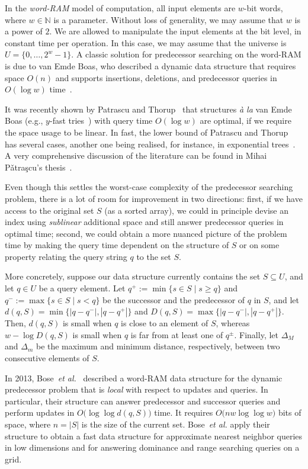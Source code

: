 \documentclass[a4paper,11pt]{article}
\newcommand{\N}{\mathbb{N}}
\newcommand{\etal}{\emph{et al.}\xspace}
\newcommand{\?}{\mskip1.5mu}
\begin{document}
In the \emph{word-RAM } model of computation,
all input elements are $w$-bit words, where
$w \in \N$ is a parameter. Without loss of 
generality, we may assume that $w$ is a power 
of $2$. We are allowed to manipulate the input 
elements at the bit level, in constant time per 
operation. In this case, we may assume that the 
universe is $U = \{0, \dots, 2^{w}-1\}$. 
A classic solution for predecessor searching on the
word-RAM is due to van Emde Boas, who
described a dynamic data structure that
requires space $O(n)$ and supports insertions,
deletions, and predecessor queries in $O(\log w)$ 
time~\cite{vEmdeBoas77,vEmdeBoasKaZi76}.


It was recently shown by Patrascu and 
Thorup~\cite{PatrascuTh06,PatrascuTh07} 
that structures \emph{\` a la} van Emde Boas 
(e.g., $y$-fast tries~\cite{Willard83}) with query
time $O(\log w)$ are optimal, if we require 
the space usage to be linear. In fast, the lower bound 
of Patrascu and Thorup~\cite{PatrascuTh06,PatrascuTh07} 
has several cases, another one being realised, for 
instance, in exponential trees~\cite{AnderssonTh07}. 
A very comprehensive discussion of the literature 
can be found in Mihai P{\v a}tra{\c s}cu's
thesis~\cite{Patrascu08}.

Even though this settles the worst-case complexity 
of the predecessor searching problem, there is a lot 
of room for improvement in two directions: first, if 
we have access to the original set $S$ (as a sorted array), 
we could in principle devise an index using 
\emph{sublinear} additional space and still answer 
predecessor queries in optimal time; second, we could
obtain a more nuanced picture of the problem time by 
making the query time dependent on the structure of $S$ 
or on some property relating the query string $q$ to 
the set $S$.

More concretely, suppose our data structure currently contains the
set $S \subseteq U$, and let $q \in U$ be a query
element.  Let $q^+ := \min\{s \in S \mid s \geq q \}$ and
$q^- := \max\{s \in S \mid s < q \}$ be the 
successor and the predecessor of $q$ in $S$, and let
$d(q, S) = \min\{|q - q^-|, |q - q^+|\}$ and 
$D(q, S) = \max\{|q - q^-|, |q - q^+|\}$.
Then, $d(q, S)$ is small when $q$ is close to an 
element of $S$, whereas $w - \log D(q, S)$
is small when $q$ is far from at least one of $q^\pm$.
Finally, let $\Delta_M$ and $\Delta_m$ be the maximum 
and minimum distance, respectively,
between two consecutive elements of $S$.

In 2013, Bose~\etal~\cite{BoseDoDuHoMo13} described
a word-RAM data structure for the dynamic predecessor
problem that is \emph{local} with respect to updates
and queries.
In particular, their structure can answer predecessor 
and successor queries and perform updates 
in $O\big(\log\log d(q, S)\big)$ time.
It requires $O\big(n w \log\log w)$ bits 
of space, where $n = |S|$ is the size of the 
current set. Bose~\etal apply their structure 
to obtain a fast data structure for approximate nearest 
neighbor queries in low dimensions and for answering
dominance and range searching queries on a grid.
\end{document}
